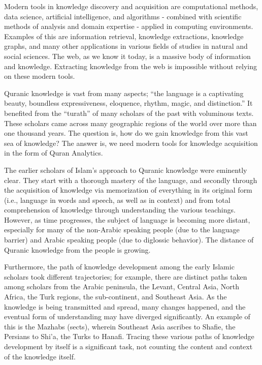 \documentclass[
]{article}
\begin{document}
Modern tools in knowledge discovery and acquisition are computational methods, data science, artificial intelligence, and algorithms - combined with scientific methods of analysis and domain expertise - applied in computing environments. Examples of this are information retrieval, knowledge extractions, knowledge graphs, and many other applications in various fields of studies in natural and social sciences. The web, as we know it today, is a massive body of information and knowledge. Extracting knowledge from the web is impossible without relying on these modern tools.

Quranic knowledge is vast from many aspects; ``the language is a captivating beauty, boundless expressiveness, eloquence, rhythm, magic, and distinction.''\citep{saeh2015} It benefited from the ``turath'' of many scholars of the past with voluminous texts. These scholars came across many geographic regions of the world over more than one thousand years. The question is, how do we gain knowledge from this vast sea of knowledge? The answer is, we need modern tools for knowledge acquisition in the form of Quran Analytics.

The earlier scholars of Islam's approach to Quranic knowledge were eminently clear. They start with a thorough mastery of the language, and secondly through the acquisition of knowledge via memorization of everything in its original form (i.e., language in words and speech, as well as in context) and from total comprehension of knowledge through understanding the various teachings. However, as time progresses, the subject of language is becoming more distant, especially for many of the non-Arabic speaking people (due to the language barrier) and Arabic speaking people (due to diglossic behavior). The distance of Quranic knowledge from the people is growing.

Furthermore, the path of knowledge development among the early Islamic scholars took different trajectories; for example, there are distinct paths taken among scholars from the Arabic peninsula, the Levant, Central Asia, North Africa, the Turk regions, the sub-continent, and Southeast Asia. As the knowledge is being transmitted and spread, many changes happened, and the eventual form of understanding may have diverged significantly. An example of this is the Mazhabs (sects), wherein Southeast Asia ascribes to Shafie, the Persians to Shi'a, the Turks to Hanafi. Tracing these various paths of knowledge development by itself is a significant task, not counting the content and context of the knowledge itself.
\end{document}
